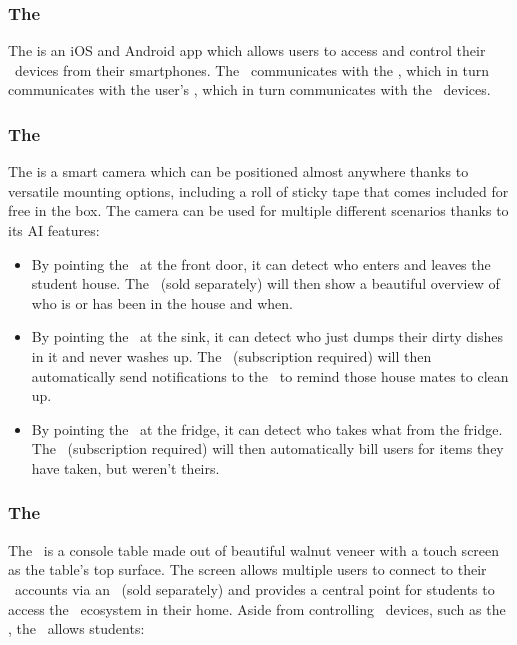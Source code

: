 \subsubsection*{The \sshApp}

The \emph{\sshApp} is an iOS and Android app which allows users to access and control their \ssh\ devices from their smartphones. The \sshApp\ communicates with the \sshCloud, which in turn communicates with the user's \sshHub, which in turn communicates with the \ssh\ devices.

\subsubsection{The \sshCamera}

The \emph{\sshCamera} is a smart camera which can be positioned almost anywhere thanks to versatile mounting options, including a roll of sticky tape that comes included for free in the box. The camera can be used for multiple different scenarios thanks to its AI features:

\begin{itemize}
    \item By pointing the \sshCamera\ at the front door, it can detect who enters and leaves the student house. The \sshConsole\ (sold separately) will then show a beautiful overview of who is or has been in the house and when.
    \item By pointing the \sshCamera\ at the sink, it can detect who just dumps their dirty dishes in it and never washes up. The \sshCloud\ (subscription required) will then automatically send notifications to the \sshApp\ to remind those house mates to clean up.
    \item By pointing the \sshCamera\ at the fridge, it can detect who takes what from the fridge. The \sshCloud\ (subscription required) will then automatically bill users for items they have taken, but weren't theirs.
\end{itemize}

\subsubsection{The \sshConsole}

The \emph{\sshConsole}\ is a console table made out of beautiful walnut veneer with a touch screen as the table's top surface. The screen allows multiple users to connect to their \ssh\ accounts via an \sshHub\ (sold separately) and provides a central point for students to access the \ssh\ ecosystem in their home. Aside from controlling \ssh\ devices, such as the \sshCamera, the \sshConsole\ allows students:

